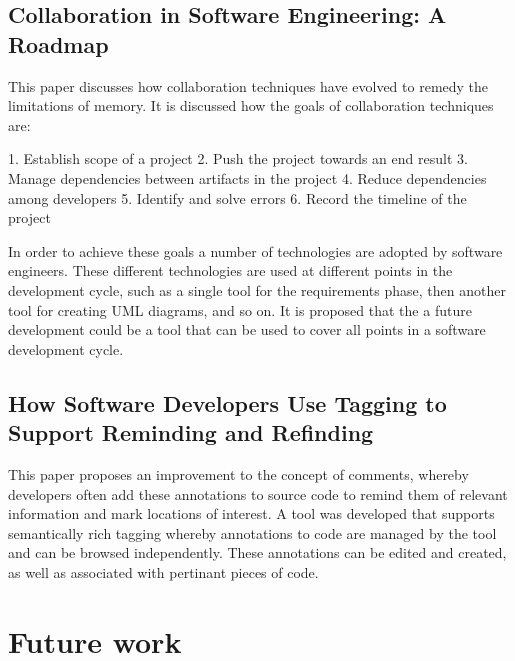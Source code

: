 \documentclass{l4proj}
\begin{document}
\section {Collaboration in Software Engineering: A Roadmap}

This paper discusses how collaboration techniques have evolved to remedy the limitations of memory. It is discussed how the goals of collaboration techniques are:

1. Establish scope of a project
2. Push the project towards an end result
3. Manage dependencies between artifacts in the project
4. Reduce dependencies among developers
5. Identify and solve errors
6. Record the timeline of the project

In order to achieve these goals a number of technologies are adopted by software engineers.  These different technologies are used at different points in the development cycle, such as a single tool for the requirements phase, then another tool for creating UML diagrams, and so on.  It is proposed that the a future development could be a tool that can be used to cover all points in a software development cycle.

\section {How Software Developers Use Tagging to Support Reminding and Refinding}

This paper proposes an improvement to the concept of comments, whereby developers often add these annotations to source code to remind them of relevant information and mark locations of interest.  A tool was developed that supports semantically rich tagging whereby annotations to code are managed by the tool and can be browsed independently.  These annotations can be edited and created, as well as associated with pertinant pieces of code.

\chapter{Future work}




\begin{appendices}


\end{appendices}




\end{document}
